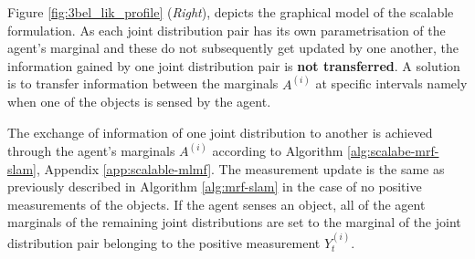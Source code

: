 Figure \ref{fig:3bel_lik_profile} (\textit{Right}), depicts the graphical model of the scalable formulation. 
As each joint distribution pair has its own parametrisation of the agent's marginal and these do not subsequently get updated by one another,
the information gained by one joint distribution pair is \textbf{not transferred}.
A solution is to transfer information between the marginals $A^{(i)}$ at specific intervals namely when one of the objects is sensed by the agent. 

The exchange of information of one joint distribution to another is achieved through the agent's marginals $A^{(i)}$ according to Algorithm \ref{alg:scalabe-mrf-slam},  Appendix \ref{app:scalable-mlmf}.
The measurement update is the same as previously described in Algorithm \ref{alg:mrf-slam}  in the case of no positive measurements of the objects. If the agent
senses an object, all of the agent marginals of the remaining joint distributions are set to the marginal of the joint distribution pair belonging to the positive 
measurement $Y^{(i)}_t$. 


